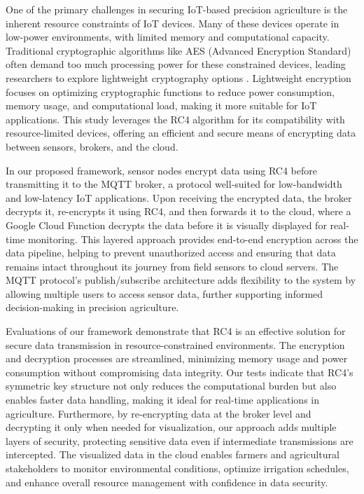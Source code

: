 \documentclass[conference]{IEEEtran}
\begin{document}
One of the primary challenges in securing IoT-based precision agriculture is the inherent resource constraints of IoT devices. Many of these devices operate in low-power environments, with limited memory and computational capacity. Traditional cryptographic algorithms like AES (Advanced Encryption Standard) often demand too much processing power for these constrained devices, leading researchers to explore lightweight cryptography options \cite{ref4}\cite{ref8}. Lightweight encryption focuses on optimizing cryptographic functions to reduce power consumption, memory usage, and computational load, making it more suitable for IoT applications. This study leverages the RC4 algorithm for its compatibility with resource-limited devices, offering an efficient and secure means of encrypting data between sensors, brokers, and the cloud.

In our proposed framework, sensor nodes encrypt data using RC4 before transmitting it to the MQTT broker, a protocol well-suited for low-bandwidth and low-latency IoT applications. Upon receiving the encrypted data, the broker decrypts it, re-encrypts it using RC4, and then forwards it to the cloud, where a Google Cloud Function decrypts the data before it is visually displayed for real-time monitoring. This layered approach provides end-to-end encryption across the data pipeline, helping to prevent unauthorized access and ensuring that data remains intact throughout its journey from field sensors to cloud servers. The MQTT protocol's publish/subscribe architecture adds flexibility to the system by allowing multiple users to access sensor data, further supporting informed decision-making in precision agriculture.

Evaluations of our framework demonstrate that RC4 is an effective solution for secure data transmission in resource-constrained environments. The encryption and decryption processes are streamlined, minimizing memory usage and power consumption without compromising data integrity. Our tests indicate that RC4's symmetric key structure not only reduces the computational burden but also enables faster data handling, making it ideal for real-time applications in agriculture. Furthermore, by re-encrypting data at the broker level and decrypting it only when needed for visualization, our approach adds multiple layers of security, protecting sensitive data even if intermediate transmissions are intercepted. The visualized data in the cloud enables farmers and agricultural stakeholders to monitor environmental conditions, optimize irrigation schedules, and enhance overall resource management with confidence in data security.
\end{document}
